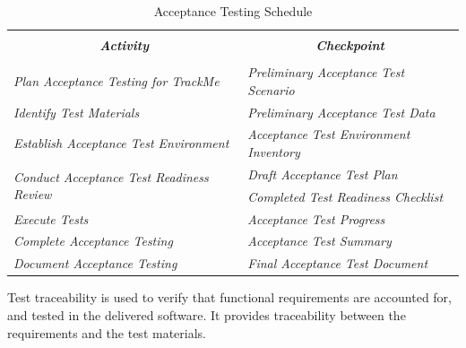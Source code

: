 \documentclass[a4paper, hidelinks, 12pt]{report}
\begin{document}
\begin{table}[H]
  \centering
  \caption{Acceptance Testing Schedule}
    \begin{tabular}{|l|l|}
    \toprule
   \multicolumn{1}{|c|}{\multirow{3}[2]{*}{\textit{\textbf{Activity}}}} &  \\
& \multicolumn{1}{c|}{\textit{\textbf{Checkpoint}}} \\
 &  \\
    \midrule
    \textit{Plan Acceptance Testing for  TrackMe} & \textit{Preliminary Acceptance Test Scenario} \\
    \midrule
    \textit{Identify Test Materials} & \textit{Preliminary Acceptance Test Data} \\
    \midrule
    \textit{Establish Acceptance Test Environment} & \textit{Acceptance Test Environment Inventory} \\
    \midrule
    \multirow{2}[2]{*}{\textit{Conduct Acceptance Test Readiness Review}} & \textit{Draft Acceptance Test Plan} \\
          & \textit{Completed Test Readiness Checklist} \\
    \midrule
    \textit{Execute Tests} & \textit{Acceptance Test Progress} \\
    \midrule
    \textit{Complete Acceptance Testing} & \textit{Acceptance Test Summary } \\
    \midrule
    \textit{Document Acceptance Testing} & \textit{Final Acceptance Test Document} \\
    \bottomrule
    \end{tabular}%
  \label{tab:addlabel}%
\end{table}%
Test traceability is used to verify that functional requirements are accounted for, and tested in the delivered software.  It provides traceability between the requirements and the test materials.\\
\end{document}
